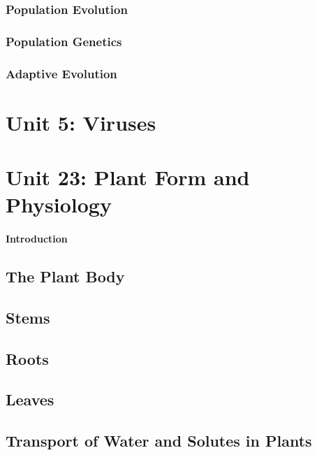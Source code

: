 \documentclass[12pt]{article}
\begin{document}
\subsubsection{Population Evolution}
\subsubsection{Population Genetics}
\subsubsection{Adaptive Evolution}

\section{Unit 5: Viruses}

\section{Unit 23: Plant Form and Physiology}
\paragraph{Introduction}
\subsection{The Plant Body}
\subsection{Stems}
\subsection{Roots}
\subsection{Leaves}
\subsection{Transport of Water and Solutes in Plants}
\end{document}
